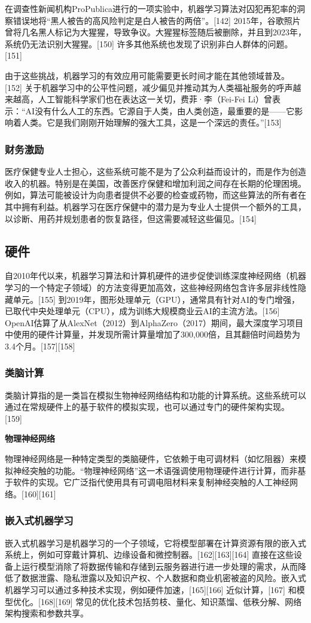 在调查性新闻机构ProPublica进行的一项实验中，机器学习算法对囚犯再犯率的洞察错误地将“黑人被告的高风险判定是白人被告的两倍”。[142] 2015年，谷歌照片曾将几名黑人标记为大猩猩，导致争议。大猩猩标签随后被删除，并且到2023年，系统仍无法识别大猩猩。[150] 许多其他系统也发现了识别非白人群体的问题。[151]  

由于这些挑战，机器学习的有效应用可能需要更长时间才能在其他领域普及。[152] 关于机器学习中的公平性问题，减少偏见并推动其为人类福祉服务的呼声越来越高，人工智能科学家们也在表达这一关切，费菲·李（Fei-Fei Li）曾表示：“AI没有什么人工的东西。它源自于人类，由人类创造，最重要的是——它影响着人类。它是我们刚刚开始理解的强大工具，这是一个深远的责任。”[153]
\subsubsection{财务激励}  
医疗保健专业人士担心，这些系统可能不是为了公众利益而设计的，而是作为创造收入的机器。特别是在美国，改善医疗保健和增加利润之间存在长期的伦理困境。例如，算法可能被设计为向患者提供不必要的检查或药物，而这些算法的所有者在其中拥有利益。机器学习在医疗保健中的潜力是为专业人士提供一个额外的工具，以诊断、用药并规划患者的恢复路径，但这需要减轻这些偏见。[154]
\subsection{硬件}  
自2010年代以来，机器学习算法和计算机硬件的进步促使训练深度神经网络（机器学习的一个特定子领域）的方法变得更加高效，这些神经网络包含许多层非线性隐藏单元。[155] 到2019年，图形处理单元（GPU），通常具有针对AI的专门增强，已取代中央处理单元（CPU），成为训练大规模商业云AI的主流方法。[156] OpenAI估算了从AlexNet（2012）到AlphaZero（2017）期间，最大深度学习项目中使用的硬件计算量，并发现所需计算量增加了300,000倍，且其翻倍时间趋势为3.4个月。[157][158]
\subsubsection{类脑计算}  
类脑计算指的是一类旨在模拟生物神经网络结构和功能的计算系统。这些系统可以通过在常规硬件上的基于软件的模拟实现，也可以通过专门的硬件架构实现。[159]

\textbf{物理神经网络}  

物理神经网络是一种特定类型的类脑硬件，它依赖于电可调材料（如忆阻器）来模拟神经突触的功能。“物理神经网络”这一术语强调使用物理硬件进行计算，而非基于软件的实现。它广泛指代使用具有可调电阻材料来复制神经突触的人工神经网络。[160][161]
\subsubsection{嵌入式机器学习}  
嵌入式机器学习是机器学习的一个子领域，它将模型部署在计算资源有限的嵌入式系统上，例如可穿戴计算机、边缘设备和微控制器。[162][163][164] 直接在这些设备上运行模型消除了将数据传输和存储到云服务器进行进一步处理的需求，从而降低了数据泄露、隐私泄露以及知识产权、个人数据和商业机密被盗的风险。嵌入式机器学习可以通过多种技术实现，例如硬件加速，[165][166] 近似计算，[167] 和模型优化。[168][169] 常见的优化技术包括剪枝、量化、知识蒸馏、低秩分解、网络架构搜索和参数共享。